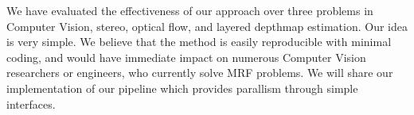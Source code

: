 We have evaluated the effectiveness of our approach over three problems
in Computer Vision, stereo, optical flow, and layered
depthmap estimation.
%
Our idea is very simple. We believe that the method is easily
reproducible with minimal coding, and would have immediate impact on
numerous Computer Vision researchers or engineers, who currently solve
MRF problems. We will share our implementation of our pipeline which provides
parallism through simple interfaces.


%
%


%



%



%








